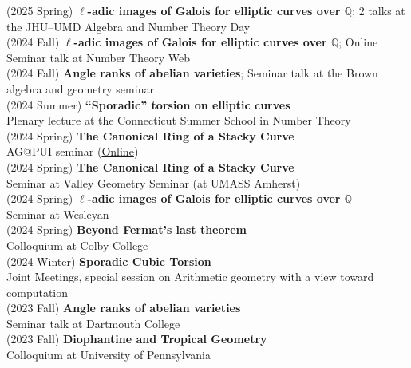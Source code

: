 \documentclass[margin,line]{res}
\begin{document}
\begin{resume}
(2025 Spring) \textbf{$\ell$-adic images of Galois for elliptic curves over $\mathbb{Q}$};
2 talks at the JHU–UMD Algebra and Number Theory Day
\vspace{.05cm}\\  
(2024 Fall) \textbf{$\ell$-adic images of Galois for elliptic curves over $\mathbb{Q}$};
Online Seminar talk at Number Theory Web
\vspace{.05cm}\\  
(2024 Fall) \textbf{Angle ranks of abelian varieties};
Seminar talk at the Brown algebra and geometry seminar
\vspace{.05cm}\\
  (2024 Summer) \textbf{“Sporadic” torsion on elliptic curves}\\
Plenary lecture at the Connecticut Summer School in Number Theory
\vspace{.05cm}\\    
(2024 Spring) \textbf{The Canonical Ring of a Stacky Curve}\\
AG@PUI seminar (\href{https://sites.google.com/fordham.edu/agatpui/home}{Online})
\vspace{.05cm}\\    
(2024 Spring) \textbf{The Canonical Ring of a Stacky Curve}\\
Seminar at Valley Geometry Seminar (at UMASS Amherst)
\vspace{.05cm}\\  
(2024 Spring) \textbf{$\ell$-adic images of Galois for elliptic curves over $\mathbb{Q}$}\\
Seminar at Wesleyan
\vspace{.05cm}\\  
(2024 Spring) \textbf{Beyond Fermat's last theorem}\\
Colloquium at Colby College
\vspace{.05cm}\\  
(2024 Winter) \textbf{Sporadic Cubic Torsion}\\
Joint Meetings, special session on Arithmetic geometry with a view toward computation
\vspace{.05cm}\\  
(2023 Fall) \textbf{Angle ranks of abelian varieties}\\
Seminar talk at Dartmouth College
\vspace{.05cm}\\  
(2023 Fall) \textbf{Diophantine and Tropical Geometry}\\
Colloquium at University of Pennsylvania

\end{resume}
\end{document}

